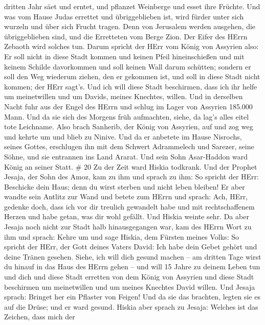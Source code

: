 dritten Jahr säet und erntet, und pflanzet Weinberge und esset ihre
Früchte.  Und was vom Hause Judas errettet und
übriggeblieben ist, wird fürder unter sich wurzeln und über sich Frucht
tragen.  Denn von Jerusalem werden ausgehen, die
übriggeblieben sind, und die Erretteten vom Berge Zion. Der Eifer des
HErrn Zebaoth wird solches tun.  Darum spricht der HErr vom
König von Assyrien also: Er soll nicht in diese Stadt kommen und keinen
Pfeil hineinschießen und mit keinem Schilde davorkommen und soll keinen
Wall darum schütten;  sondern er soll den Weg wiederum
ziehen, den er gekommen ist, und soll in diese Stadt nicht kommen; der
HErr sagt's.  Und ich will diese Stadt beschirmen, dass ich
ihr helfe um meinetwillen und um Davids, meines Knechtes, willen.
 Und in derselben Nacht fuhr aus der Engel des HErrn und
schlug im Lager von Assyrien 185.000 Mann. Und da sie sich des Morgens
früh aufmachten, siehe, da lag's alles eitel tote Leichname.
 Also brach Sanherib, der König von Assyrien, auf und zog
weg und kehrte um und blieb zu Ninive.  Und da er anbetete
im Hause Nisrochs, seines Gottes, erschlugen ihn mit dem Schwert
Adrammelech und Sarezer, seine Söhne, und sie entrannen ins Land Ararat.
Und sein Sohn Asar-Haddon ward König an seiner Statt. \# 20 
Zu der Zeit ward Hiskia todkrank. Und der Prophet Jesaja, der Sohn des
Amoz, kam zu ihm und sprach zu ihm: So spricht der HErr: Beschicke dein
Haus; denn du wirst sterben und nicht leben bleiben!  Er
aber wandte sein Antlitz zur Wand und betete zum HErrn und sprach:
 Ach, HErr, gedenke doch, dass ich vor dir treulich
gewandelt habe und mit rechtschaffenem Herzen und habe getan, was dir
wohl gefällt. Und Hiskia weinte sehr.  Da aber Jesaja noch
nicht zur Stadt halb hinausgegangen war, kam des HErrn Wort zu ihm und
sprach:  Kehre um und sage Hiskia, dem Fürsten meines Volks:
So spricht der HErr, der Gott deines Vaters David: Ich habe dein Gebet
gehört und deine Tränen gesehen. Siehe, ich will dich gesund machen --
am dritten Tage wirst du hinauf in das Haus des HErrn gehen --
 und will 15 Jahre zu deinem Leben tun und dich und diese
Stadt erretten von dem König von Assyrien und diese Stadt beschirmen um
meinetwillen und um meines Knechtes David willen.  Und
Jesaja sprach: Bringet her ein Pflaster von Feigen! Und da sie das
brachten, legten sie es auf die Drüse; und er ward gesund. 
Hiskia aber sprach zu Jesaja: Welches ist das Zeichen, dass mich der
